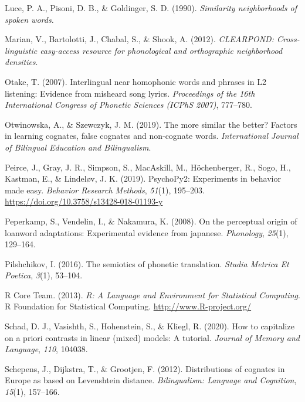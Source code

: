 \documentclass[
]{article}
\newlength{\cslhangindent}
\newenvironment{CSLReferences}[2] %
 {\begin{list}{}{%
  \setlength{\itemindent}{0pt}
  \setlength{\leftmargin}{0pt}
  \setlength{\parsep}{0pt}
  \ifodd #1
   \setlength{\leftmargin}{\cslhangindent}
   \setlength{\itemindent}{-1\cslhangindent}
  \fi
  \setlength{\itemsep}{#2\baselineskip}}}
 {\end{list}}
\begin{document}
\begin{CSLReferences}{1}{0}
Luce, P. A., Pisoni, D. B., \& Goldinger, S. D. (1990). \emph{Similarity
neighborhoods of spoken words.}

Marian, V., Bartolotti, J., Chabal, S., \& Shook, A. (2012).
\emph{{CLEARPOND}: {Cross-linguistic} easy-access resource for
phonological and orthographic neighborhood densities}.

Otake, T. (2007). Interlingual near homophonic words and phrases in L2
listening: Evidence from misheard song lyrics. \emph{Proceedings of the
16th International Congress of Phonetic Sciences (ICPhS 2007)},
777--780.

Otwinowska, A., \& Szewczyk, J. M. (2019). The more similar the better?
Factors in learning cognates, false cognates and non-cognate words.
\emph{International Journal of Bilingual Education and Bilingualism}.

Peirce, J., Gray, J. R., Simpson, S., MacAskill, M., Höchenberger, R.,
Sogo, H., Kastman, E., \& Lindeløv, J. K. (2019). {PsychoPy2}:
{Experiments} in behavior made easy. \emph{Behavior Research Methods},
\emph{51}(1), 195--203. \url{https://doi.org/10.3758/s13428-018-01193-y}

Peperkamp, S., Vendelin, I., \& Nakamura, K. (2008). On the perceptual
origin of loanword adaptations: Experimental evidence from japanese.
\emph{Phonology}, \emph{25}(1), 129--164.

Pilshchikov, I. (2016). The semiotics of phonetic translation.
\emph{Studia Metrica Et Poetica}, \emph{3}(1), 53--104.

R Core Team. (2013). \emph{R: {A Language} and {Environment} for
{Statistical Computing}}. R Foundation for Statistical Computing.
\url{http://www.R-project.org/}

Schad, D. J., Vasishth, S., Hohenstein, S., \& Kliegl, R. (2020). How to
capitalize on a priori contrasts in linear (mixed) models: {A} tutorial.
\emph{Journal of Memory and Language}, \emph{110}, 104038.

Schepens, J., Dijkstra, T., \& Grootjen, F. (2012). Distributions of
cognates in {Europe} as based on {Levenshtein} distance.
\emph{Bilingualism: Language and Cognition}, \emph{15}(1), 157--166.


\end{CSLReferences}
\end{document}
